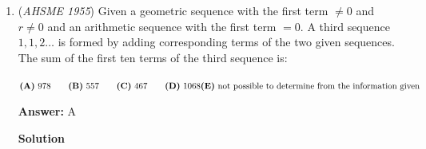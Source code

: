 \begin{enumerate}
$\textbf{(A)}\ x=3y\\ \textbf{(B)}\ x=2y\\ \textbf{(C)}\ x=60^\circ\\ \textbf{(D)}\ \text{there is no special relationship between }x\text{ and }y\\ \textbf{(E)}\ x=2y\text{ or }x=3y\text{, depending upon the length of }AB$

 \textbf{Answer: }A



\textbf{Solution}

Let $r$ be the radius of circle $O$. 

 Since $OB$ is a radius, $OB = r$. We are given that $BC$ equals the radius, so $BC = r$ as well. Therefore, $\triangle OBC$ is isosceles with $OB = BC$. 

 In $\triangle OBC$, the angles opposite the equal sides are equal:
 \[\angle BOC = \angle BCO = y\]

 The exterior angle of $\triangle OBC$ at vertex $B$ is:
 \[\angle ABO = \angle BOC + \angle BCO = y + y = 2y\]

 Since $OA$ and $OB$ are both radii of circle $O$, $OA = OB = r$, making $\triangle OAB$ isosceles with $OA = OB$. Therefore:
 \[\angle OAB = \angle ABO = 2y\]

 Now consider $\triangle AOC$. The exterior angle at vertex $O$ is $x = \angle AOD$. By the exterior angle theorem on $\triangle AOC$:
 \[x = \angle OAC + \angle ACO\]

 Since $\angle OAC = \angle OAB = 2y$ and $\angle ACO = \angle BCO = y$, we have:
 \[x = 2y + y = 3y\]

 Thus, $x = 3y$, which corresponds to $\mathbf{(A)}$.

 


	\item (\textit{AHSME 1955}) Given a geometric sequence with the first term $\neq 0$ and $r \neq 0$ and an arithmetic sequence with the first term $=0$. 
A third sequence $1,1,2\ldots$ is formed by adding corresponding terms of the two given sequences. 
The sum of the first ten terms of the third sequence is: 


 $\textbf{(A)}\ 978\qquad\textbf{(B)}\ 557\qquad\textbf{(C)}\ 467\qquad\textbf{(D)}\ 1068\\ \textbf{(E)}\ \text{not possible to determine from the information given}$

 \textbf{Answer: }A



\textbf{Solution}


\end{enumerate}
